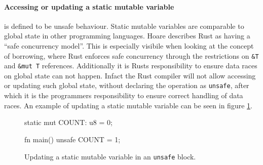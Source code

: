\documentclass[twocolumn]{article}
\begin{document}
\paragraph{Accessing or updating a static mutable variable} is defined to be unsafe behaviour.
Static mutable variables are comparable to global state in other programming languages.
Hoare describes Rust as having a ``safe concurrency model''\cite{HoareInterview}.
This is especially visibile when looking at the concept of borrowing, where Rust enforces safe concurrency through the restrictions on \texttt{&T} and \texttt{&mut T} references.
Additionally it is Rusts responsibility to ensure data races on global state can not happen.
Infact the Rust compiler will not allow accessing or updating such global state, without declaring the operation
as \texttt{unsafe}, after which it is the programmers responsibility to ensure correct handling of data races.
An example of updating a static mutable variable can be seen in figure \ref{unsafe-staticmut}.
\begin{figure}
\begin{rustcode}
static mut COUNT: u8 = 0;

fn main() {
    unsafe {
        COUNT = 1;
    }
}
\end{rustcode}
\vspace{-2em}
\caption{Updating a static mutable variable in an \texttt{unsafe} block.}
\label{unsafe-staticmut}
\end{figure}
\end{document}
